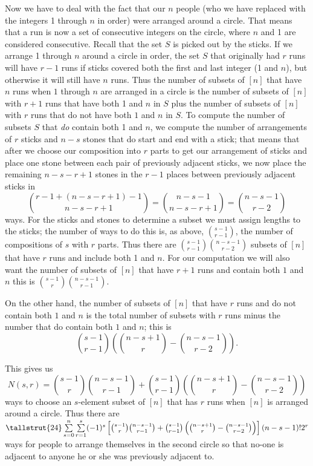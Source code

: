 {Now we have to deal with the fact that our $n$ people (who we have replaced
with the integers 1 through $n$ in order) were arranged around a circle. That
means that a run is now a set of consecutive integers on the circle, where $n$
and 1 are considered consecutive.  Recall that the set $S$ is picked out by the
sticks. If we arrange 1 through
$n$ around a circle in order, the set
$S$ that originally had
$r$ runs will have $r-1$ runs if sticks covered both the first and last integer
(1 and $n$), but otherwise it will still have $n$ runs.  Thus the number of
subsets of $[n]$ that have $n$ runs when $1$ through $n$ are  arranged in a
circle is the number of subsets of $[n]$ with $r+1$ runs that have both 1 and
$n$ in $S$ plus the number of subsets of $[n]$ with $r$ runs that do not have
both $1$ and
$n$ in $S$. To compute the number of subsets $S$ that {\em do} contain both 1
and $n$, we compute the number of arrangements of  $r$ sticks and $n-s$ stones
that do start and end with a stick; that means that after we choose our
composition into $r$ parts to get our arrangement of sticks and place one stone
between each pair of previously adjacent sticks, we now place the remaining
$n-s-r+1$ stones in the $r-1$ places between previously adjacent sticks in
$${r-1 + (n-s-r+1)-1\choose n-s-r+1}={n-s-1\choose n-s-r+1}={n-s-1\choose r-2}$$
ways. For the sticks and stones to determine a subset we must assign lengths to
the sticks; the number of ways to do this is, as above, $s-1\choose r-1$, the
number of compositions of $s$ with $r$ parts. Thus there are
${s-1\choose r-1}{n-s-1\choose r-2}$ subsets of
$[n]$ that have
$r$ runs and include both 1 and $n$.  For our computation we will also want the
number of subsets of $[n]$ that have $r+1$ runs and contain both $1$ and $n$
this is
${s-1\choose r}{n-s-1\choose r-1}$.

On the other hand, the number of subsets of $[n]$ that have $r$ runs and do not
contain both $1$ and $n$ is the total number of subsets with $r$ runs minus the
number that do contain both $1$ and $n$; this is $${s-1\choose
r-1}\left({n-s+1\choose r}- {n-s-1\choose
r-2}\right).$$ 


This gives us $$N(s,r) ={s-1\choose r}{n-s-1\choose r-1}+{s-1\choose
r-1}\left({n-s+1\choose r}- {n-s-1\choose
r-2}\right)$$ 
ways to choose an $s$-element subset of $[n]$ that has $r$ runs when $[n]$ is
arranged around a circle.  Thus there are\\
$\tallstrut{24}\sum\limits_{s=0}^n\sum\limits_{r=1}^{s}(-1)^s\left[{s-1\choose
r}{n-s-1\choose r-1}+{s-1\choose r-1}\left({n-s+1\choose r}- {n-s-1\choose
r-2}\right)\right](n-s-1)!2^r$
\\ ways for people to arrange themselves in the
second circle so that no-one is adjacent to anyone he or she was previously
adjacent to.
}

